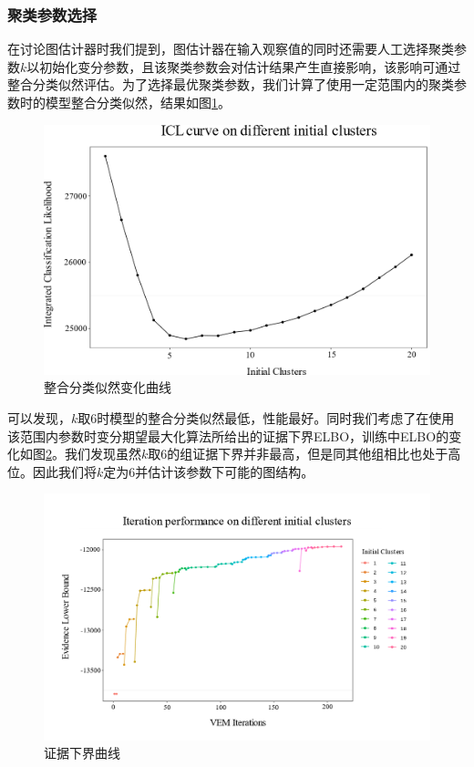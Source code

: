 \subsubsection{聚类参数选择}

在讨论图估计器时我们提到，图估计器在输入观察值的同时还需要人工选择聚类参数$k$以初始化变分参数，且该聚类参数会对估计结果产生直接影响，该影响可通过整合分类似然评估。为了选择最优聚类参数，我们计算了使用一定范围内的聚类参数时的模型整合分类似然，结果如图\ref{fig:ICL}。

\begin{figure}[!ht]
\centering
\includegraphics[width=12cm]{figures/Chapter4/VEM/Model/ICL.png}
\caption{整合分类似然变化曲线} \label{fig:ICL}
\end{figure}

可以发现，$k$取6时模型的整合分类似然最低，性能最好。同时我们考虑了在使用该范围内参数时变分期望最大化算法所给出的证据下界ELBO，训练中ELBO的变化如图\ref{fig:ELBO}。我们发现虽然$k$取6的组证据下界并非最高，但是同其他组相比也处于高位。因此我们将$k$定为6并估计该参数下可能的图结构。

\begin{figure}[!ht]
\centering
\includegraphics[width=14cm]{figures/Chapter4/VEM/Model/ELBO.png}
\caption{证据下界曲线} \label{fig:ELBO}
\end{figure}


